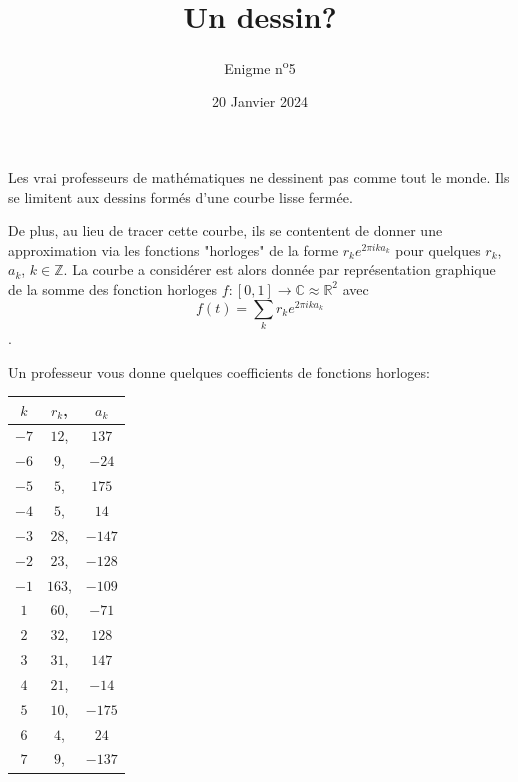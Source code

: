 \documentclass[a4paper, top=10mm]{article}
\title{\textbf{\huge{Un dessin?}}}
\author{Enigme n\textsuperscript{o}5}
\date{20 Janvier 2024}
\begin{document}
	\maketitle
	
	\large
	Les vrai professeurs de mathématiques ne dessinent pas comme tout le monde.
	Ils se limitent aux dessins formés d'une courbe lisse fermée.
	
	De plus, au lieu de tracer cette courbe, ils se contentent de donner une approximation via les fonctions "horloges" de la forme $r_k e^{2\pi i k a_k}$ pour quelques $r_k$, $a_k$, $k \in \mathbb{Z}$.
	La courbe a considérer est alors donnée par représentation graphique de la somme des fonction horloges $f: [0,1] \to \mathbb{C} \approx \mathbb{R}^2$ avec $$f(t) = \sum_{k} r_k e^{2\pi i k a_k}$$.
	
	Un professeur vous donne quelques coefficients de fonctions horloges:
	
	\vspace{1cm}
	\begin{flushleft}
		\begin{tabular}{|c|c|c|}
			\hline
			$k$ & $r_k$, & $a_k$\\
			\hline
			$-7$ & $12$, & $137$\\
			$-6$ & $9$, & $-24$\\
			$-5$ & $5$, & $175$\\
			$-4$ & $5$, & $14$\\
			$-3$ & $28$, & $-147$\\
			$-2$ & $23$, & $-128$\\
			$-1$ & $163$, & $-109$\\
			$1$ & $60$, & $-71$\\
			$2$ & $32$, & $128$\\
			$3$ & $31$, & $147$\\
			$4$ & $21$, & $-14$\\
			$5$ & $10$, & $-175$\\
			$6$ & $4$, & $24$\\
			$7$ & $9$, & $-137$\\
			\hline
		\end{tabular}
	\end{flushleft}
	
\end{document}
